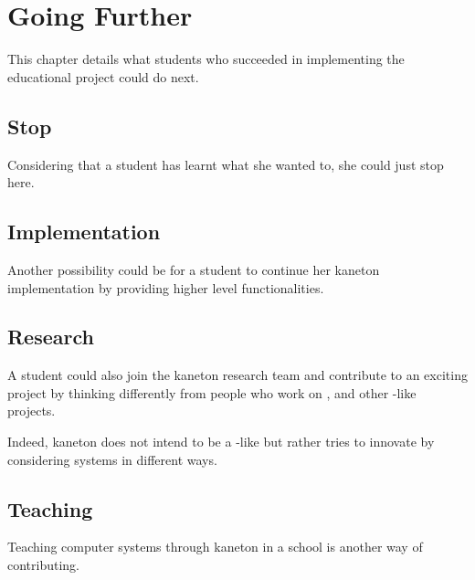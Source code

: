 %
%
%
%
%
%

%
%

\chapter{Going Further}
\label{chapter:further}

This chapter details what students who succeeded in implementing the
 educational project could do next.

\newpage

%
%

%
%

\section{Stop}

Considering that a student has learnt what she wanted to, she could just stop
here.

%
%

\section{Implementation}

Another possibility could be for a student to continue her kaneton
implementation by providing higher level functionalities.

%
%

\section{Research}

A student could also join the kaneton research team and contribute to an
exciting project by thinking differently from people who work on ,
 and other -like projects.

Indeed, kaneton does not intend to be a -like but rather tries to
innovate by considering systems in different ways.

%
%

\section{Teaching}

Teaching computer systems through kaneton in a school is another way of
contributing.
